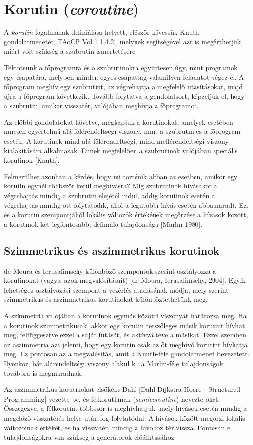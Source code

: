 \section{Korutin (\textit{coroutine})}

A \textit{korutin} fogalmának definiálása helyett, először kövessük Knuth gondolatmenetét [TAoCP Vol.1 1.4.2], melynek segítségével azt is megérthetjük, miért volt szükség a szubrutin ismertetésére.

Tekintsünk a főprogramra és a szubrutinokra együttesen úgy, mint programok egy csapatára, melyben minden egyes csapattag valamilyen feladatot végez el. A főprogram meghív egy szubrutint, az végrehajtja a megfelelő utasításokat, majd újra a főprogram következik. Tovább folytatva a gondolatsort, képzeljük el, hogy a szubrutin, amikor visszatér, valójában meghívja a főprogramot. 

Az előbbi gondolatokat követve, megkapjuk a korutinokat, amelyek esetében nincsen egyértelmű alá-fölérendeltségi viszony, mint a szubrutin és a főprogram esetén. A korutinok mind alá-fölérendeltségi, mind mellérendeltségi viszony kialakítására alkalmasak. Ennek megfelelően a szubrutinok valójában speciális korutinok [Knuth].

Felmerülhet azonban a kérdés, hogy mi történik abban az esetben, amikor egy korutin egynél többször kerül meghívásra? Míg szubrutinok hívásakor a végrehajtás mindig a szubrutin elejétől indul, addig korutinok esetén a végrehajtás mindig ott folytatódik, ahol a legutóbbi hívás esetén abbamaradt. Ez, és a korutin szempontjából lokális változók értékének megőrzése a hívások között, a korutinok két legfontosabb, definiáló tulajdonsága [Marlin 1980].

\subsection{Szimmetrikus és aszimmetrikus korutinok}

de Moura és Ierusalimschy különböző szempontok szerint osztályozza a korutinokat (vagyis azok megvalósításait) [de Moura, Ierusalimschy, 2004]. Egyik lehetséges osztályozási szempont a vezérlés átadásának módja, mely szerint szimmetrikus és aszimmetrikus korutinokat különböztethetünk meg.

A szimmetria valójában a korutinok egymás közötti viszonyát határozza meg. Ha a korutinok szimmetrikusak, akkor egy korutin tetszőleges másik korutint hívhat meg, felfüggesztve ezzel a saját futását, és aktívvá téve a másikat. Ezzel szemben az aszimmetria azt jelenti, hogy egy korutin csak az őt meghívó korutint hívhatja meg. Ez pontosan az a megvalósítás, amit a Knuth-féle gondolatmenet bevezetett. Ilyenkor, bár alárendeltségi viszony alakul ki, a Marlin-féle tulajdonságok továbbra is megmaradnak.

Az aszimmetrikus korutinokat elsőként Dahl [Dahl-Dijkstra-Hoare - Structured Programming] vezette be, és félkorutinnak (\textit{semicoroutine}) nevezte őket. Összegezve, a félkorutint többször is meghívhatjuk, mely hívások esetén mindig a megelőző visszatérés helye után fog folytatódni. A hívások között megőrzi lokális változóinak értékét, és ha visszatér, mindig a hívóhoz tér vissza. Pontosan e tulajdonságokra van szükség a generátorok előállításához.
